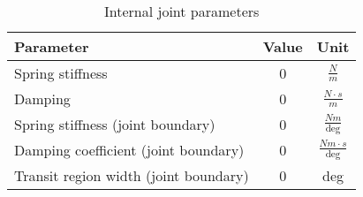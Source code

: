 \begin{comment}
The  thorax is represented by a rigid body and a main coordinate frame.
Each of the robots legs consists of 3 rigid bodies(coxa, femur and tibia) which are connected to each other by 2 joints.
A third joint then attaches the coxa and the leg as a whole to the main body.
Like the leg of an insect, the movement plane of the joint connecting coxa and thorax is parallel to the ground and orthogonal towards the other two joints.
Each of the joints used has 1 (rotational) DoF.
To position each rigid body and joint correctly, rigid transformations are used to translate and rotate each component.

As mentioned above, joints can receive as input a torque to be applied and can output sensory data, such as the joints position, velocity and acceleration. 
\end{comment}


\begin{table}
	\centering
	\begin{tabular}{| l | c | c |}
		\hline
		\textbf{Parameter} & \textbf{Value} & \textbf{Unit}\\
		\hline
		\hline
		Spring stiffness & 0 & $\frac{N}{m}$\\
		
		Damping & 0 &  $\frac{N \cdot s}{m}$\\
		
		Spring stiffness (joint boundary) & 0 & $\frac{Nm}{\text{deg}}$ \\
		
		Damping coefficient (joint boundary) &  0 & $\frac{Nm \cdot s}{\text{deg}}$\\
		
		Transit region width (joint boundary) & 0 &  deg\\
		\hline
	\end{tabular}
	\caption{Internal joint parameters}
	\label{table: Joint parameters}
\end{table}


